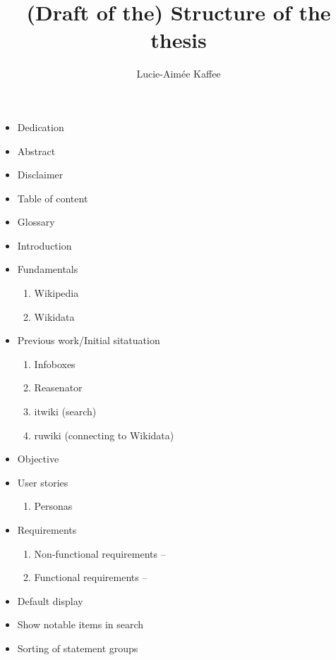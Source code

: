 \documentclass[11pt]{article}
\title {{(Draft of the) Structure of the thesis}}
\author {Lucie-Aim\'{e}e Kaffee}
\date{}
\begin{document}
  \maketitle
  \tableofcontents
  
  \begin{itemize}

  \item Dedication
  \item Abstract
  \item Disclaimer
  \item Table of content
  \item Glossary
  \item Introduction
  \item Fundamentals
  \begin{enumerate}
    \item Wikipedia
    \item Wikidata
  \end{enumerate}
  \item Previous work/Initial sitatuation
  \begin{enumerate}
    \item Infoboxes
    \item Reasenator
    \item itwiki (search)
    \item ruwiki (connecting to Wikidata)
  \end{enumerate}
  \item Objective
  \item User stories
  \begin{enumerate}
   \item Personas
  \end{enumerate}
  \item Requirements
  \begin{enumerate}
   \item Non-functional requirements --
   \item Functional requirements -- 
  \end{enumerate}
  \item Default display
  \item Show notable items in search
  \item Sorting of statement groups
  \end{itemize}
\end{document}
